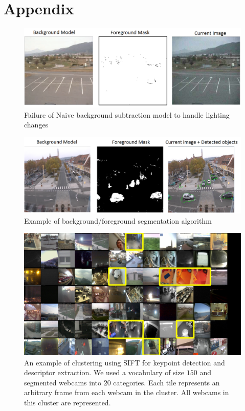 \documentclass{article}
\begin{document}
\section{Appendix}
\begin{figure}[h]
\centering
\includegraphics[scale = 0.4]{LightingConditions}
\caption{Failure of Naive background subtraction model to handle lighting changes}
\label{Fig:LightingConditions}
\end{figure}
\begin{figure}[h]
\centering
\includegraphics[scale = 0.4]{BackgroundSubtraction1}
\caption{Example of background/foreground segmentation algorithm}
\label{Fig:ForegroundDetection}
\end{figure}
\begin{figure}[h]
  \centering
  \includegraphics[scale = 0.32, angle = 90]{HighlightedAnimals}
  \caption{An example of clustering using SIFT for keypoint detection and
  descriptor extraction. We used a vocabulary of size $150$ and segmented
webcams into $20$ categories. Each tile represents an arbitrary frame from each
webcam in the cluster. All webcams in this cluster are represented.}
  \label{Fig:HighlightedAnimals}
\end{figure}
\end{document}
